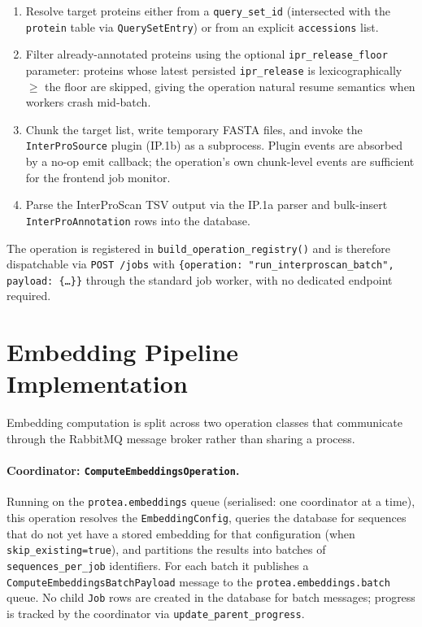 \begin{enumerate}
  \item Resolve target proteins either from a \texttt{query\_set\_id}
    (intersected with the \texttt{protein} table via \texttt{QuerySetEntry})
    or from an explicit \texttt{accessions} list.
  \item Filter already-annotated proteins using the optional
    \texttt{ipr\_release\_floor} parameter: proteins whose latest persisted
    \texttt{ipr\_release} is lexicographically $\geq$ the floor are skipped,
    giving the operation natural resume semantics when workers crash mid-batch.
  \item Chunk the target list, write temporary FASTA files, and invoke the
    \texttt{InterProSource} plugin (IP.1b) as a subprocess. Plugin events are
    absorbed by a no-op emit callback; the operation's own chunk-level events
    are sufficient for the frontend job monitor.
  \item Parse the InterProScan TSV output via the IP.1a parser and bulk-insert
    \texttt{InterProAnnotation} rows into the database.
\end{enumerate}

The operation is registered in \texttt{build\_operation\_registry()} and is
therefore dispatchable via \texttt{POST /jobs} with
\texttt{\{operation: "run\_interproscan\_batch", payload: \{\ldots\}\}} through
the standard job worker, with no dedicated endpoint required.

\section{Embedding Pipeline Implementation}
\label{sec:impl-embedding-pipeline}

Embedding computation is split across two operation classes that communicate
through the RabbitMQ message broker rather than sharing a process.

\paragraph{Coordinator: \texttt{ComputeEmbeddingsOperation}.}
Running on the \texttt{protea.embeddings} queue (serialised: one coordinator
at a time), this operation resolves the \texttt{EmbeddingConfig}, queries the
database for sequences that do not yet have a stored embedding for that
configuration (when \texttt{skip\_existing=true}), and partitions the results
into batches of \texttt{sequences\_per\_job} identifiers. For each batch it
publishes a \texttt{ComputeEmbeddingsBatchPayload} message to the
\texttt{protea.embeddings.batch} queue. No child \texttt{Job} rows are created
in the database for batch messages; progress is tracked by the coordinator
via \texttt{update\_parent\_progress}.

